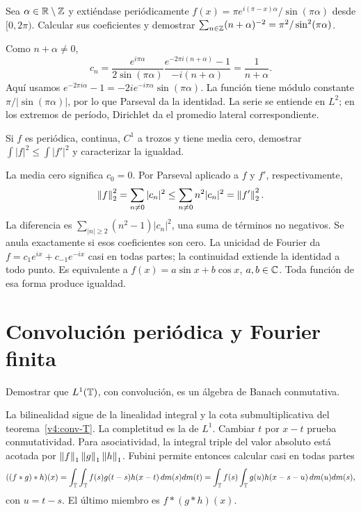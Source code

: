 \begin{ejercicio}\label{ej:v4-l06-6}
Sea $\alpha\in\mathbb R\setminus\mathbb Z$ y extiéndase periódicamente $f(x)=\pi e^{i(\pi-x)\alpha}/\sin(\pi\alpha)$ desde $[0,2\pi)$. Calcular sus coeficientes y demostrar $\sum_{n\in\mathbb Z}(n+\alpha)^{-2}=\pi^2/\sin^2(\pi\alpha)$.
\end{ejercicio}
\begin{solucion}
Como $n+\alpha\ne0$,
\[
 c_n=\frac{e^{i\pi\alpha}}{2\sin(\pi\alpha)}
 \frac{e^{-2\pi i(n+\alpha)}-1}{-i(n+\alpha)}
 =\frac1{n+\alpha}.
\]
Aquí usamos $e^{-2\pi i\alpha}-1=-2ie^{-i\pi\alpha}\sin(\pi\alpha)$. La función tiene módulo constante $\pi/|\sin(\pi\alpha)|$, por lo que Parseval da la identidad. La serie se entiende en $L^2$; en los extremos de período, Dirichlet da el promedio lateral correspondiente.
\end{solucion}

\begin{ejercicio}\label{ej:v4-l06-7}
Si $f$ es periódica, continua, $C^1$ a trozos y tiene media cero, demostrar $\int|f|^2\leq\int|f'|^2$ y caracterizar la igualdad.
\end{ejercicio}
\begin{solucion}
La media cero significa $c_0=0$. Por Parseval aplicado a $f$ y $f'$, respectivamente,
\[
 \left\lVert f\right\rVert_2^2=\sum_{n\ne0}|c_n|^2
 \leq\sum_{n\ne0}n^2|c_n|^2=\left\lVert f'\right\rVert_2^2.
\]
La diferencia es $\sum_{|n|\geq2}(n^2-1)|c_n|^2$, una suma de términos no negativos. Se anula exactamente si esos coeficientes son cero. La unicidad de Fourier da $f=c_1e^{ix}+c_{-1}e^{-ix}$ casi en todas partes; la continuidad extiende la identidad a todo punto. Es equivalente a $f(x)=a\sin x+b\cos x$, $a,b\in\mathbb C$. Toda función de esa forma produce igualdad.
\end{solucion}

\chapter{Convolución periódica y Fourier finita}

\begin{ejercicio}\label{ej:v4-l08-1}
Demostrar que $L^1(\mathbb T)$, con convolución, es un álgebra de Banach conmutativa.
\end{ejercicio}
\begin{solucion}
La bilinealidad sigue de la linealidad integral y la cota submultiplicativa del teorema~\ref{v4:conv-T}. La completitud es la de $L^1$. Cambiar $t$ por $x-t$ prueba conmutatividad. Para asociatividad, la integral triple del valor absoluto está acotada por $\left\lVert f\right\rVert_1\left\lVert g\right\rVert_1\left\lVert h\right\rVert_1$. Fubini permite entonces calcular casi en todas partes
\[
 ((f*g)*h)(x)=\int_\mathbb T\int_\mathbb T f(s)g(t-s)h(x-t)\,dm(s)dm(t)
 =\int_\mathbb T f(s)\int_\mathbb T g(u)h(x-s-u)\,dm(u)dm(s),
\]
con $u=t-s$. El último miembro es $f*(g*h)(x)$.
\end{solucion}

